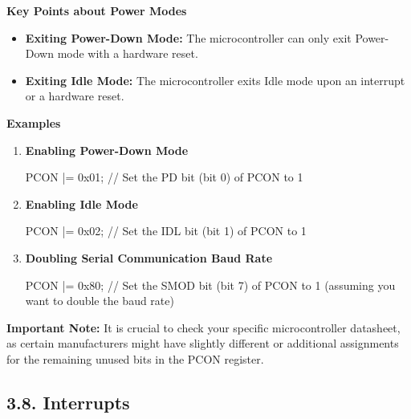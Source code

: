 \documentclass[
]{article}
\newenvironment{Shaded}{}{}
\newcommand{\NormalTok}[1]{#1}
\begin{document}
\textbf{Key Points about Power Modes}

\begin{itemize}
\item
  \textbf{Exiting Power-Down Mode:} The microcontroller can only exit
  Power-Down mode with a hardware reset.
\item
  \textbf{Exiting Idle Mode:} The microcontroller exits Idle mode upon
  an interrupt or a hardware reset.
\end{itemize}

\textbf{Examples}

\begin{enumerate}
\def\labelenumi{\arabic{enumi}.}
\item
  \textbf{Enabling Power-Down Mode}

\begin{Shaded}
\begin{Highlighting}[]
\NormalTok{PCON |= 0x01; // Set the PD bit (bit 0) of PCON to \textquotesingle{}1\textquotesingle{}}
\end{Highlighting}
\end{Shaded}
\item
  \textbf{Enabling Idle Mode}

\begin{Shaded}
\begin{Highlighting}[]
\NormalTok{PCON |= 0x02; // Set the IDL bit (bit 1) of PCON to \textquotesingle{}1\textquotesingle{}}
\end{Highlighting}
\end{Shaded}
\item
  \textbf{Doubling Serial Communication Baud Rate}

\begin{Shaded}
\begin{Highlighting}[]
\NormalTok{PCON |= 0x80; // Set the SMOD bit (bit 7) of PCON to \textquotesingle{}1\textquotesingle{} (assuming you want to double the baud rate)}
\end{Highlighting}
\end{Shaded}
\end{enumerate}

\textbf{Important Note:} It is crucial to check your specific
microcontroller datasheet, as certain manufacturers might have slightly
different or additional assignments for the remaining unused bits in the
PCON register.

\hypertarget{38-interrupts}{%
\subsection{3.8. Interrupts}\label{38-interrupts}}
\end{document}
